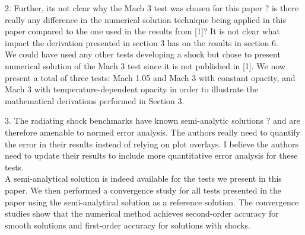 \documentclass{article}
\begin{document}
{\color{blue}
2. Further, its not clear why the Mach 3 test was chosen for this paper ? is there really any difference in the numerical solution technique being applied in this paper compared to the one used in the results from [1]? It is not clear what impact the derivation presented in section 3 has on the results in section 6.\\}
We could have used any other tests developing a shock but chose to present numerical solution of the Mach 3 test since it is not published in [1]. We now present a total of three tests: Mach 1.05 and Mach 3 with constant opacity, and Mach 3 with temperature-dependent opacity in order to illustrate the mathematical derivations performed in Section 3.
\bigskip

{\color{blue}
3. 
The radiating shock benchmarks have known semi-analytic solutions ? and are therefore amenable to normed error analysis. The authors really need to quantify the error in their results instead of relying on plot overlays. I believe the authors need to update their results to include more quantitative error analysis for these tests.
\\}
A semi-analytical solution is indeed available for the tests we present in this paper. We then performed a convergence study for all tests presented in the paper using the semi-analytical solution as a reference solution. The convergence studies show that the numerical method achieves second-order accuracy for smooth solutions and first-order accuracy for solutions with shocks. 
\bigskip
\end{document}
